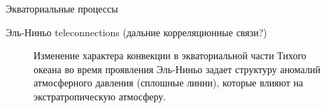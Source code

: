 \begin{chapter}{Экваториальные процессы}
\begin{section}{Эль-Ниньо teleconnections (дальние корреляционные связи?)}
\begin{figure}[h!]
\caption{Изменение характера конвекции в экваториальной части
Тихого океана во время проявления Эль-Ниньо задает структуру аномалий 
атмосферного давления (сплошные линии), 
которые влияют на экстратропическую атмосферу.~\cite{Rasmusson:1983}}
\label{fig:pressureanomaly}
\end{figure}
%


\end{section}
\end{chapter}
